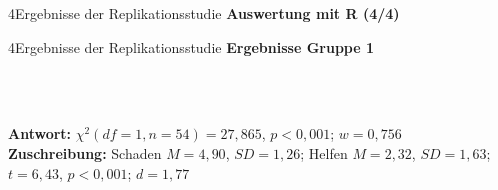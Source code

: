\documentclass[xcolor=table,9pt,aspectratio=169]{beamer}
\begin{document}
\begin{frame}{\vspace*{10mm}4\hspace*{1em}Ergebnisse der Replikationsstudie}
\textbf{Auswertung mit R (4/4)}\\
\smallskip
\lstset{style=mystyle}

\end{frame}


\begin{frame}{\vspace*{10mm}4\hspace*{1em}Ergebnisse der Replikationsstudie}
\textbf{Ergebnisse Gruppe 1}\\
\begin{multicols}{2}
   \begin{center}
      \\
      \\
   \end{center}
\end{multicols}
\textbf{Antwort:} $\chi^2(df=1,n=54)=27,865$, $p<0,001$; $w=0,756$\\

\medskip
\textbf{Zuschreibung:} Schaden $M=4,90$, $SD=1,26$; Helfen $M=2,32$, $SD=1,63$; $t=6,43$, $p<0,001$; $d=1,77$
\end{frame}
\end{document}
